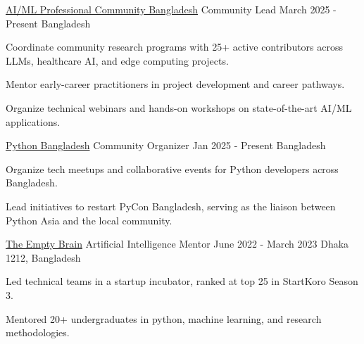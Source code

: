 


\begin{cventries}
\cventry
    {\href{https://www.linkedin.com/company/aiml-professional-community-bangladesh/}{AI/ML Professional Community Bangladesh}} %
    {Community Lead} %
    {March 2025 - Present} %
    {Bangladesh} %
    {
      \begin{cvitems} %
        \item{Coordinate community research programs with 25+ active contributors across LLMs, healthcare AI, and edge computing projects.}
        \item{Mentor early-career practitioners in project development and career pathways.}
        \item{Organize technical webinars and hands-on workshops on state-of-the-art AI/ML applications.}
      \end{cvitems}
    }

  \cventry
    {\href{https://pythonbd.org/}{Python Bangladesh}} %
    {Community Organizer} %
    {Jan 2025 - Present} %
    {Bangladesh} %
    {
      \begin{cvitems} %
        \item {Organize tech meetups and collaborative events for Python developers across Bangladesh.}
        \item{Lead initiatives to restart PyCon Bangladesh, serving as the liaison between Python Asia and the local community.}
      \end{cvitems}
    }

  \cventry
    {\href{https://empty-brain.github.io/}{The Empty Brain}} %
    {Artificial Intelligence Mentor} %
    {June 2022 - March 2023} %
    {Dhaka 1212, Bangladesh} %
    {
      \begin{cvitems} %
        \item{Led technical teams in a startup incubator, ranked at top 25 in StartKoro Season 3.}
        \item{Mentored 20+ undergraduates in python, machine learning, and research methodologies.}
      \end{cvitems}
    }    


\end{cventries}
